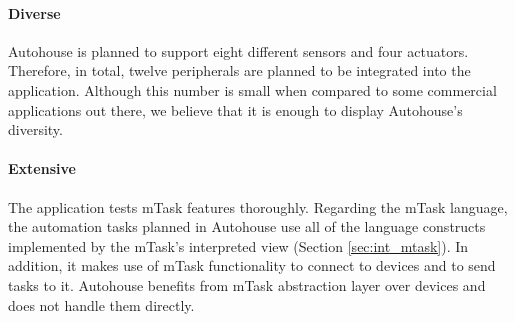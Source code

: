 \paragraph{Diverse} Autohouse is planned to support eight different sensors and four actuators. Therefore, in total, twelve peripherals are planned to be integrated into the application. Although this number is small when compared to some commercial applications out there, we believe that it is enough to display Autohouse's diversity.

\paragraph{Extensive} The application tests mTask features thoroughly. Regarding the mTask language, the automation tasks planned in Autohouse use all of the language constructs implemented by the mTask's interpreted view (Section \ref{sec:int_mtask}). In addition, it makes use of mTask functionality to connect to devices and to send tasks to it. Autohouse benefits from mTask abstraction layer over devices and does not handle them directly.

